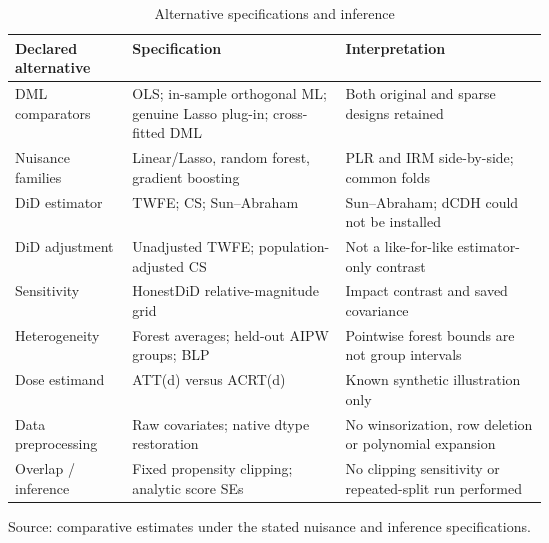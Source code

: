 \begin{table}[htbp]
\centering
\footnotesize
\caption{Alternative specifications and inference}
\begin{tabularx}{\linewidth}{p{0.22\linewidth}p{0.40\linewidth}X}
\toprule
Declared alternative & Specification & Interpretation \\
\midrule
DML comparators & OLS; in-sample orthogonal ML; genuine Lasso plug-in; cross-fitted DML & Both original and sparse designs retained \\
Nuisance families & Linear/Lasso, random forest, gradient boosting & PLR and IRM side-by-side; common folds \\
DiD estimator & TWFE; CS; Sun–Abraham & Sun–Abraham; dCDH could not be installed \\
DiD adjustment & Unadjusted TWFE; population-adjusted CS & Not a like-for-like estimator-only contrast \\
Sensitivity & HonestDiD relative-magnitude grid & Impact contrast and saved covariance \\
Heterogeneity & Forest averages; held-out AIPW groups; BLP & Pointwise forest bounds are not group intervals \\
Dose estimand & ATT(d) versus ACRT(d) & Known synthetic illustration only \\
Data preprocessing & Raw covariates; native dtype restoration & No winsorization, row deletion or polynomial expansion \\
Overlap / inference & Fixed propensity clipping; analytic score SEs & No clipping sensitivity or repeated-split run performed \\
\bottomrule
\end{tabularx}
\par\vspace{3pt}\begin{minipage}{\linewidth}\footnotesize Source: comparative estimates under the stated nuisance and inference specifications.\allowbreak{}\end{minipage}
\end{table}
